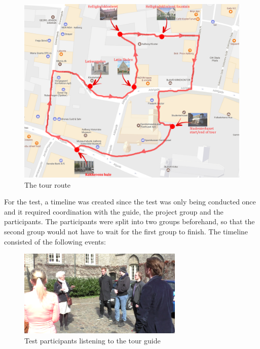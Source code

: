 \begin{figure}[h!]
   \centering
   \includegraphics[width=\textwidth]{figures/Tour_map.png}
   \caption{The tour route}\label{fig:map}
\end{figure}

For the test, a timeline was created since the test was only being conducted once and it required coordination with the guide, the project group and the participants. The participants were split into two groups beforehand, so that the second group would not have to wait for the first group to finish. The timeline consisted of the following events:

\begin{figure}[h!]
   \centering
   \includegraphics[width=0.7\textwidth]{figures/participants_listen.png}
   \caption{Test participants listening to the tour guide}\label{fig:participants_listen}
\end{figure}

